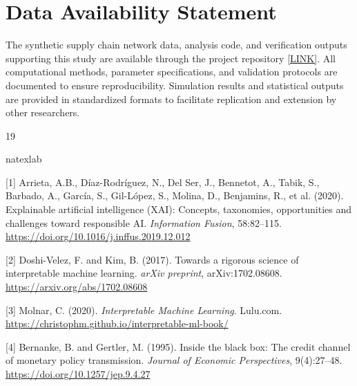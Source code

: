 \documentclass[a4 paper, 11pt,twoside]{article}
\newcommand{\0}{\Bf{0}}
\theoremstyle{definition}
\begin{document}
\section*{Data Availability Statement}
The synthetic supply chain network data, analysis code, and verification outputs supporting this study are available through the project repository \href{https://github.com/omoshola-o/explainable-credit-intelligence}{[LINK]}. All computational methods, parameter specifications, and validation protocols are documented to ensure reproducibility. Simulation results and statistical outputs are provided in standardized formats to facilitate replication and extension by other researchers.
\def\cprime{$'$} \def\cprime{$'$}
{\color{Brown}\begin{thebibliography}{19}
{\color{black}

\expandafter\ifx\csname natexlab\endcsname\relax\def\natexlab#1{#1}\fi
\providecommand{\bibinfo}[2]{#2}
\ifx\xfnm\relax \def\xfnm[#1]{\unskip,\space#1}\fi
\raggedright

\label{ref1}[1] Arrieta, A.B., Díaz-Rodríguez, N., Del Ser, J., Bennetot, A., Tabik, S., Barbado, A., García, S., Gil-López, S., Molina, D., Benjamins, R., et al. (2020). Explainable artificial intelligence (XAI): Concepts, taxonomies, opportunities and challenges toward responsible AI. \emph{Information Fusion}, 58:82--115. \url{https://doi.org/10.1016/j.inffus.2019.12.012}

\par\vspace{0.8em}

\label{ref2}[2] Doshi-Velez, F. and Kim, B. (2017). Towards a rigorous science of interpretable machine learning. \emph{arXiv preprint}, arXiv:1702.08608. \url{https://arxiv.org/abs/1702.08608}

\par\vspace{0.8em}

\label{ref3}[3] Molnar, C. (2020). \emph{Interpretable Machine Learning}. Lulu.com. \url{https://christophm.github.io/interpretable-ml-book/}

\label{ref4}[4] Bernanke, B. and Gertler, M. (1995). Inside the black box: The credit channel of monetary policy transmission. \emph{Journal of Economic Perspectives}, 9(4):27--48. \url{https://doi.org/10.1257/jep.9.4.27}

}
\end{thebibliography}}
\end{document}
